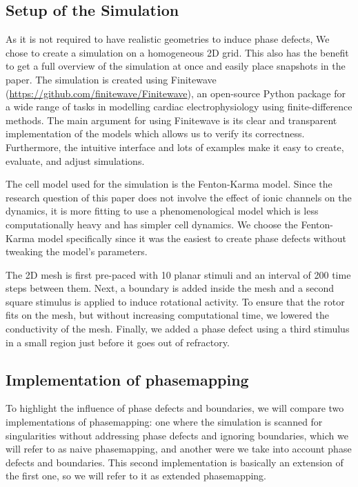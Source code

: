 \documentclass[twocolumn]{article}
\begin{document}
\subsection{Setup of the Simulation}

As it is not required to have realistic geometries to induce phase
defects, We chose to create a simulation on a homogeneous 2D grid. This
also has the benefit to get a full overview of the simulation at once
and easily place snapshots in the paper.
The simulation is created using Finitewave
(\url{https://github.com/finitewave/Finitewave}), an open-source Python
package for a wide range of tasks in modelling cardiac electrophysiology
using finite-difference methods. The main argument for using Finitewave
is its clear and transparent implementation of the models which allows
us to verify its correctness. Furthermore, the intuitive interface and
lots of examples make it easy to create, evaluate, and adjust
simulations.

The cell model used for the simulation is the Fenton-Karma model. Since
the research question of this paper does not involve the effect of ionic
channels on the dynamics, it is more fitting to use a phenomenological
model which is less computationally heavy and has simpler cell dynamics.
We choose the Fenton-Karma model specifically since it was the easiest
to create phase defects without tweaking the model's parameters.

The 2D mesh is first pre-paced with 10 planar stimuli and an interval of
200 time steps between them. Next, a boundary is added inside the mesh
and a second square stimulus is applied to induce rotational activity.
To ensure that the rotor fits on the mesh, but without increasing
computational time, we lowered the conductivity of the mesh. Finally, we
added a phase defect using a third stimulus in a small region just
before it goes out of refractory.

\subsection{Implementation of phasemapping}

To highlight the influence of phase defects and boundaries, we will
compare two implementations of phasemapping: one where the simulation is
scanned for singularities without addressing phase defects and ignoring
boundaries, which we will refer to as naive phasemapping, and another
were we take into account phase defects and boundaries. This second
implementation is basically an extension of the first one, so we will
refer to it as extended phasemapping.
\end{document}
